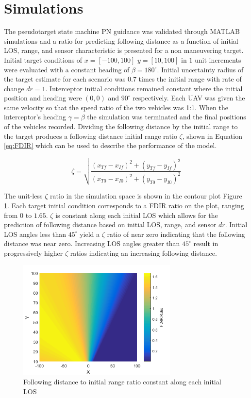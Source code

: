 \documentclass[conference]{IEEEtran}
\begin{document}
\section{Simulations}
The pseudotarget state machine PN guidance was validated through MATLAB simulations and a ratio for predicting following distance as a function of initial LOS, range, and sensor characteristic is presented for a non maneuvering target. Initial target conditions of $x = [-100,100]$ $y = [10,100]$ in $1$ unit increments were evaluated with a constant heading of $\beta = 180^{\circ}$. Initial uncertainty radius of the target estimate for each scenario was $0.7$ times the initial range with rate of change $dr = 1$. Interceptor initial conditions remained constant where the initial position and heading were $(0,0)$ and $90^{\circ}$ respectively. Each UAV was given the same velocity so that the speed ratio of the two vehicles was 1:1. When the interceptor's heading $\gamma = \beta$ the simulation was terminated and the final positions of the vehicles recorded. Dividing the following distance by the initial range to the target produces a following distance initial range ratio $\zeta$, shown in Equation \ref{eq:FDIR} which can be used to describe the performance of the model.


\begin{equation} 
\label{eq:FDIR}
\zeta = \sqrt{\frac{(x_{Tf}-x_{If})^2+(y_{Tf}-y_{If})^2}{(x_{T0}-x_{I0})^2+(y_{T0}-y_{I0})^2}}
\end{equation}

The unit-less $\zeta$ ratio in the simulation space is shown in the contour plot Figure \ref{fig:Rays}. Each target initial condition corresponds to a FDIR ratio on the plot, ranging from $0$ to $1.65$. $\zeta$ is constant along each initial LOS which allows for the prediction of following distance based on initial LOS, range, and sensor $dr$. Initial LOS angles less than $45^{\circ}$ yield a $\zeta$ ratio of near zero indicating that the following distance was near zero. Increasing LOS angles greater than $45^{\circ}$ result in progressively higher $\zeta$ ratios indicating an increasing following distance.



\begin{figure}[H]
	\centering
	\includegraphics[width=8cm]{FDIR_Rays.png}
	\caption{Following distance to initial range ratio constant along each initial LOS}
	\label{fig:Rays}
\end{figure}
\end{document}
